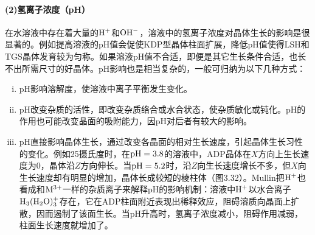 \paragraph{(2)氢离子浓度（pH）}在水溶液中存在着大量的$\rm H^+$和$\rm OH^-$，溶液中的氢离子浓度对晶体生长的影响是很显著的。例如提高溶液的pH值会促使KDP型晶体柱面扩展，降低pH值使得LSH和TGS晶体发育较为匀称。如果溶液pH值不合适，即便是其它生长条件合适，也长不出所需尺寸的好晶体。pH影响也是相当复杂的，一般可归纳为以下几种方式：
\begin{enumerate}[(i)]\itemsep -0.5ex
\item pH影响溶解度，使溶液中离子平衡发生变化。
\item pH改变杂质的活性，即改变杂质络合或水合状态，使杂质敏化或钝化。pH的作用也可能改变晶面的吸附能力，因pH对后者有较大的影响。
\item pH直接影响晶体生长，通过改变各晶面的相对生长速度，引起晶体生长习性的变化。例如25摄氏度时，在$\rm pH=3.8$的溶液中，ADP晶体在$X$方向上生长速度为0，晶体沿$Z$方向伸长。当$\rm pH=5.2$时，沿$Z$向生长速度增长不多，但$X$向生长速度却有明显的增加，晶体长成较短的棱柱体（图3.32）。Mullin把$\rm H^+$也看成和$\rm M^{3+}$一样的杂质离子来解释pH的影响机制：溶液中$\rm H^+$以水合离子$\rm H_3(H_2O)_3^+$存在，它在ADP柱面附近表现出稀释效应，阻碍溶质向晶面上扩散，因而遏制了该面生长。当pH升高时，氢离子浓度减小，阻碍作用减弱，柱面生长速度就增加了。


\end{enumerate}